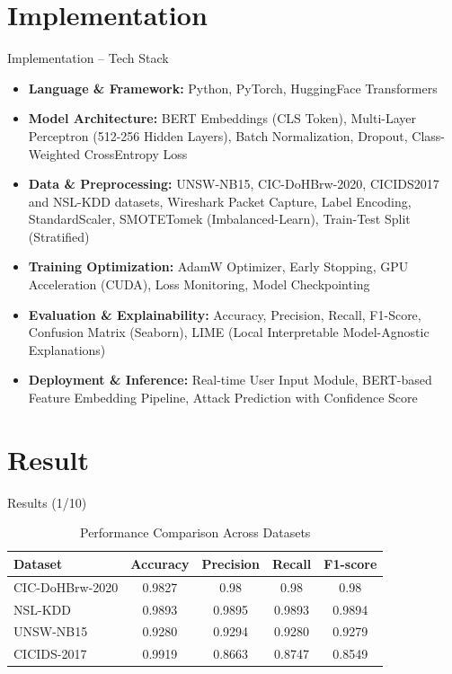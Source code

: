 \documentclass[aspectratio=169,xcolor=dvipsnames]{beamer}
\begin{document}
\section{Implementation}

\begin{frame}{Implementation -- Tech Stack}
\small
\begin{itemize}

\item \textbf{Language \& Framework:}
Python, PyTorch, HuggingFace Transformers 

\item \textbf{Model Architecture:}
BERT Embeddings (CLS Token), Multi-Layer Perceptron (512-256 Hidden Layers), Batch Normalization, Dropout, Class-Weighted CrossEntropy Loss

\item \textbf{Data \& Preprocessing:}
UNSW-NB15, CIC-DoHBrw-2020, CICIDS2017 and NSL-KDD datasets, Wireshark Packet Capture, Label Encoding, StandardScaler, SMOTETomek (Imbalanced-Learn), Train-Test Split (Stratified)

\item \textbf{Training Optimization:}
AdamW Optimizer, Early Stopping, GPU Acceleration (CUDA), Loss Monitoring, Model Checkpointing

\item \textbf{Evaluation \& Explainability:}
Accuracy, Precision, Recall, F1-Score, Confusion Matrix (Seaborn), LIME (Local Interpretable Model-Agnostic Explanations)

\item \textbf{Deployment \& Inference:}
Real-time User Input Module, BERT-based Feature Embedding Pipeline, Attack  Prediction with Confidence Score



\end{itemize}
\end{frame}



\section{Result}

\begin{frame}{Results (1/10)}
\begin{table}[h]
\centering
\caption{Performance Comparison Across Datasets}
\begin{tabular}{lcccc}
\hline
\textbf{Dataset} & \textbf{Accuracy} & \textbf{Precision} & \textbf{Recall} & \textbf{F1-score} \\
\hline
CIC-DoHBrw-2020 & 0.9827 & 0.98   & 0.98   & 0.98   \\
NSL-KDD         & 0.9893 & 0.9895 & 0.9893 & 0.9894 \\
UNSW-NB15       & 0.9280 & 0.9294 & 0.9280 & 0.9279 \\
CICIDS-2017     & 0.9919 & 0.8663 & 0.8747 & 0.8549 \\
\hline
\end{tabular}
\end{table}
\end{frame}
\end{document}
